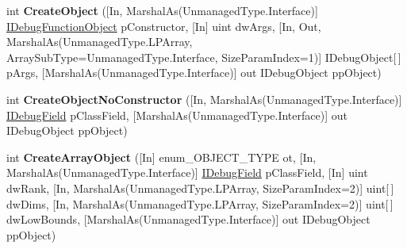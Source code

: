 \begin{DoxyCompactItemize}
\item 
\hypertarget{interface_microsoft_1_1_visual_studio_1_1_debugger_1_1_interop_e_e_1_1_i_debug_function_object_a95665a4c79621f674c45d41e3dbaf5d0}{int {\bfseries Create\+Object} (\mbox{[}In, Marshal\+As(Unmanaged\+Type.\+Interface)\mbox{]} \hyperlink{interface_microsoft_1_1_visual_studio_1_1_debugger_1_1_interop_e_e_1_1_i_debug_function_object}{I\+Debug\+Function\+Object} p\+Constructor, \mbox{[}In\mbox{]} uint dw\+Args, \mbox{[}In, Out, Marshal\+As(Unmanaged\+Type.\+L\+P\+Array, Array\+Sub\+Type=Unmanaged\+Type.\+Interface, Size\+Param\+Index=1)\mbox{]} I\+Debug\+Object\mbox{[}$\,$\mbox{]} p\+Args, \mbox{[}Marshal\+As(Unmanaged\+Type.\+Interface)\mbox{]} out I\+Debug\+Object pp\+Object)}\label{interface_microsoft_1_1_visual_studio_1_1_debugger_1_1_interop_e_e_1_1_i_debug_function_object_a95665a4c79621f674c45d41e3dbaf5d0}

\item 
\hypertarget{interface_microsoft_1_1_visual_studio_1_1_debugger_1_1_interop_e_e_1_1_i_debug_function_object_ae9972f2b3b9c9affac221e249e705fb2}{int {\bfseries Create\+Object\+No\+Constructor} (\mbox{[}In, Marshal\+As(Unmanaged\+Type.\+Interface)\mbox{]} \hyperlink{interface_microsoft_1_1_visual_studio_1_1_debugger_1_1_interop_e_e_1_1_i_debug_field}{I\+Debug\+Field} p\+Class\+Field, \mbox{[}Marshal\+As(Unmanaged\+Type.\+Interface)\mbox{]} out I\+Debug\+Object pp\+Object)}\label{interface_microsoft_1_1_visual_studio_1_1_debugger_1_1_interop_e_e_1_1_i_debug_function_object_ae9972f2b3b9c9affac221e249e705fb2}

\item 
\hypertarget{interface_microsoft_1_1_visual_studio_1_1_debugger_1_1_interop_e_e_1_1_i_debug_function_object_a41f073efc8b5101c51062ae4a098a91a}{int {\bfseries Create\+Array\+Object} (\mbox{[}In\mbox{]} enum\+\_\+\+O\+B\+J\+E\+C\+T\+\_\+\+T\+Y\+P\+E ot, \mbox{[}In, Marshal\+As(Unmanaged\+Type.\+Interface)\mbox{]} \hyperlink{interface_microsoft_1_1_visual_studio_1_1_debugger_1_1_interop_e_e_1_1_i_debug_field}{I\+Debug\+Field} p\+Class\+Field, \mbox{[}In\mbox{]} uint dw\+Rank, \mbox{[}In, Marshal\+As(Unmanaged\+Type.\+L\+P\+Array, Size\+Param\+Index=2)\mbox{]} uint\mbox{[}$\,$\mbox{]} dw\+Dims, \mbox{[}In, Marshal\+As(Unmanaged\+Type.\+L\+P\+Array, Size\+Param\+Index=2)\mbox{]} uint\mbox{[}$\,$\mbox{]} dw\+Low\+Bounds, \mbox{[}Marshal\+As(Unmanaged\+Type.\+Interface)\mbox{]} out I\+Debug\+Object pp\+Object)}\label{interface_microsoft_1_1_visual_studio_1_1_debugger_1_1_interop_e_e_1_1_i_debug_function_object_a41f073efc8b5101c51062ae4a098a91a}


\end{DoxyCompactItemize}
